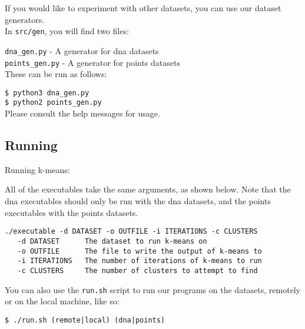 \documentclass[12pt]{article}
\begin{document}
 If you would like to experiment with other datasets, you can use our dataset generators.\\


 In \texttt{src/gen}, you will find two files: 


 \texttt{dna\_gen.py} - A generator for dna datasets \\
 \texttt{points\_gen.py} - A generator for points datasets \\


 These can be run as follows:


 \texttt{\$ python3 dna\_gen.py} \\
 \texttt{\$ python2 points\_gen.py} \\

 Please consult the help messages for usage.

 \subsection{Running}

Running k-means:

All of the executables take the same arguments, as shown below. Note that the dna executables should only be run with the dna datasets, and the points executables with the points datasets.

\begin{verbatim}
./executable -d DATASET -o OUTFILE -i ITERATIONS -c CLUSTERS
   -d DATASET      The dataset to run k-means on
   -o OUTFILE      The file to write the output of k-means to
   -i ITERATIONS   The number of iterations of k-means to run
   -c CLUSTERS     The number of clusters to attempt to find
\end{verbatim}

You can also use the \texttt{run.sh} script to run our programs on the
datasets, remotely or on the local machine, like so:

\begin{verbatim}
$ ./run.sh (remote|local) (dna|points)
\end{verbatim}
\end{document}
